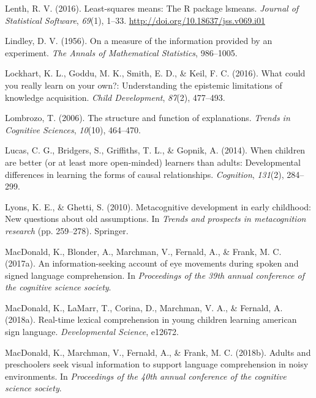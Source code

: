 \documentclass[oneside]{report}
\begin{document}
\leavevmode\hypertarget{ref-lenth2016lsmeans}{}%
Lenth, R. V. (2016). Least-squares means: The R package lsmeans.
\emph{Journal of Statistical Software}, \emph{69}(1), 1--33.
\url{http://doi.org/10.18637/jss.v069.i01}

\leavevmode\hypertarget{ref-lindley1956measure}{}%
Lindley, D. V. (1956). On a measure of the information provided by an
experiment. \emph{The Annals of Mathematical Statistics}, 986--1005.

\leavevmode\hypertarget{ref-lockhart2016could}{}%
Lockhart, K. L., Goddu, M. K., Smith, E. D., \& Keil, F. C. (2016). What
could you really learn on your own?: Understanding the epistemic
limitations of knowledge acquisition. \emph{Child Development},
\emph{87}(2), 477--493.

\leavevmode\hypertarget{ref-lombrozo2006structure}{}%
Lombrozo, T. (2006). The structure and function of explanations.
\emph{Trends in Cognitive Sciences}, \emph{10}(10), 464--470.

\leavevmode\hypertarget{ref-lucas2014children}{}%
Lucas, C. G., Bridgers, S., Griffiths, T. L., \& Gopnik, A. (2014). When
children are better (or at least more open-minded) learners than adults:
Developmental differences in learning the forms of causal relationships.
\emph{Cognition}, \emph{131}(2), 284--299.

\leavevmode\hypertarget{ref-lyons2010metacognitive}{}%
Lyons, K. E., \& Ghetti, S. (2010). Metacognitive development in early
childhood: New questions about old assumptions. In \emph{Trends and
prospects in metacognition research} (pp. 259--278). Springer.

\leavevmode\hypertarget{ref-macdonald2017info}{}%
MacDonald, K., Blonder, A., Marchman, V., Fernald, A., \& Frank, M. C.
(2017a). An information-seeking account of eye movements during spoken
and signed language comprehension. In \emph{Proceedings of the 39th
annual conference of the cognitive science society}.

\leavevmode\hypertarget{ref-macdonald2018real}{}%
MacDonald, K., LaMarr, T., Corina, D., Marchman, V. A., \& Fernald, A.
(2018a). Real-time lexical comprehension in young children learning
american sign language. \emph{Developmental Science}, e12672.

\leavevmode\hypertarget{ref-macdonald2018noise}{}%
MacDonald, K., Marchman, V., Fernald, A., \& Frank, M. C. (2018b).
Adults and preschoolers seek visual information to support language
comprehension in noisy environments. In \emph{Proceedings of the 40th
annual conference of the cognitive science society}.
\end{document}
